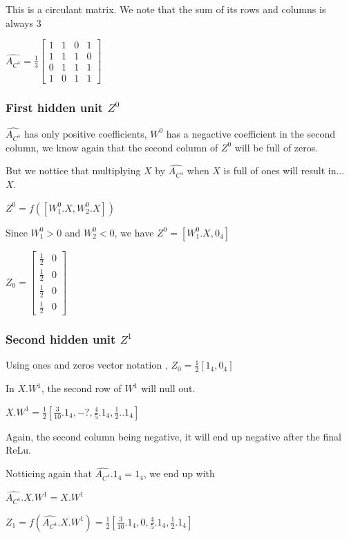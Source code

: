 \documentclass[a4paper]{article}
\begin{document}
This is a circulant matrix.
We note that the sum of its rows and columns is always $3$

$\hat{A_{C^4}} = 
\frac{1}{3} \begin{bmatrix}
    1 &  1 &  0 &  1\\
    1 &  1 &  1 &  0\\
    0 &  1 &  1 &  1\\
    1 &  0 &  1 &  1
\end{bmatrix}$
\subsubsection*{First hidden unit $Z^{0}$}
$\hat{A_{C^4}}$ has only positive coefficients, $W^0$ has a negactive coefficient in the second column, 
we know again that the second column of $Z^0$ will be full of zeros.

But we nottice that multiplying $X$ by $\hat{A_{C^4}}$ when $X$ is full of ones will result in... $X$.

$Z^{0} = f([W^{0}_{1}.X, W^{0}_{2}.X])$

Since $W^{0}_{1}>0$ and $W^{0}_{2}<0$, we have $Z^{0} = [W^{0}_{1}.X, 0_{4}]$

$Z_{0} = \left[\begin{matrix}\frac{1}{2} & 0\\\frac{1}{2} & 0\\\frac{1}{2} & 0\\\frac{1}{2} & 0\end{matrix}\right]$

\subsubsection*{Second hidden unit $Z^{1}$}

Using ones and zeros vector notation , $Z_{0} = \frac{1}{2} [1_{4}, 0_{4}]$

In $X.W^{1}$, the second row of $W^{1}$ will null out.

$X.W^{1} =\frac{1}{2} [\frac{3}{10}. 1_{4}, -?, \frac{4}{5} .1_{4}, \frac{1}{2}. .1_{4}]$

Again, the second column being negative, it will end up negative after the final ReLu.

Notticing again that $\hat{A_{C^4}}.1_{4} = 1_{4}$, we end up with 

$\hat{A_{C^4}}.X.W^{1} = X.W^{1}$

$Z_{1} = f(\hat{A_{C^4}}.X.W^{1}) = \frac{1}{2} [\frac{3}{10}. 1_{4}, 0, \frac{4}{5} .1_{4}, \frac{1}{2} .1_{4}]$
\end{document}
